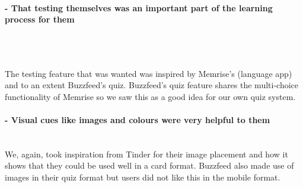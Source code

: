\documentclass{article}
\begin{document}
\paragraph{\textbf{- That testing themselves was an important part of the learning process for them}}
	\mbox{}\\
	\begin{figure}[!ht]
	  \centering
	  \hfill
	\end{figure}
	\\The testing feature that was wanted was inspired by Memrise's (language app) and to an extent Buzzfeed's quiz.  Buzzfeed's quiz feature shares the multi-choice functionality of Memrise so we saw this as a good idea for our own quiz system.

\vspace{5mm}
\paragraph{\textbf{- Visual cues like images and colours were very helpful to them}}
	\mbox{}\\
	We, again, took inspiration from Tinder for their image placement and how it shows that they could be used well in a card format.  Buzzfeed also made use of images in their quiz format but users did not like this in the mobile format.
\end{document}

